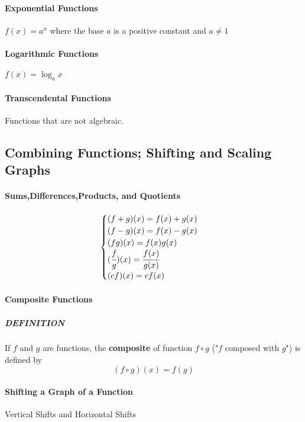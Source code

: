 \documentclass{article}
\begin{document}
            \paragraph{Exponential Functions} $f(x)=a^x$ where the base $a$ is a positive constant and $a\ne 1$
            \paragraph{Logarithmic Functions} $f(x)=\log _{a}x$ 
            \paragraph{Transcendental Functions} Functions that are not algebraic.

        \subsection{Combining Functions; Shifting and Scaling Graphs}
            \paragraph{Sums,Differences,Products, and Quotients}
            \begin{equation}
                \begin{cases}
                    (f+g)(x)=f(x)+ g(x)\\
                    (f-g)(x)=f(x)- g(x)\\
                    (fg)(x)=f(x)g(x)\\
                    (\cfrac{f}{g})(x)=\cfrac{f(x)}{g(x)}\\
                    (cf)(x)=cf(x)
                \end{cases}
            \end{equation} 

            \paragraph{Composite Functions}
            \subparagraph{DEFINITION} If $f$ and $g$ are functions, the \textbf{composite} of function $f\circ g$ ("$f$ composed with $g$") is defined by
            \begin{equation}
                (f\circ g)(x)=f(g) 
            \end{equation}

            \paragraph{Shifting a Graph of a Function}
            Vertical Shifts and Horizontal Shifts
            
\end{document}
